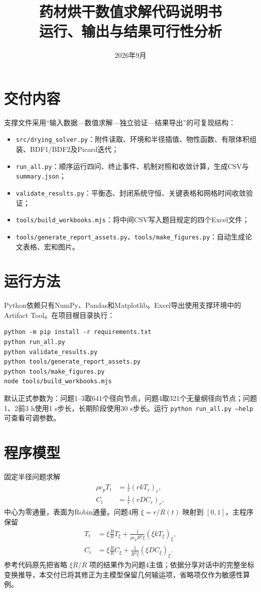 \documentclass[11pt,a4paper]{ctexart}
\title{\bfseries 药材烘干数值求解代码说明书\\[0.4em]\large 运行、输出与结果可行性分析}
\author{}
\date{2026年9月}
\begin{document}
\maketitle

\section{交付内容}
支撑文件采用“输入数据---数值求解---独立验证---结果导出”的可复现结构：
\begin{itemize}
  \item \texttt{src/drying\_solver.py}：附件读取、环境和半径插值、物性函数、有限体积组装、BDF1/BDF2及Picard迭代；
  \item \texttt{run\_all.py}：顺序运行四问、终止事件、机制对照和收敛计算，生成CSV与\texttt{summary.json}；
  \item \texttt{validate\_results.py}：平衡态、封闭系统守恒、关键表格和网格时间收敛验证；
  \item \texttt{tools/build\_workbooks.mjs}：将中间CSV写入题目规定的四个Excel文件；
  \item \texttt{tools/generate\_report\_assets.py}、\texttt{tools/make\_figures.py}：自动生成论文表格、宏和图片。
\end{itemize}

\section{运行方法}
Python依赖只有NumPy、Pandas和Matplotlib。Excel导出使用支撑环境中的Artifact Tool。在项目根目录执行：
\begin{verbatim}
python -m pip install -r requirements.txt
python run_all.py
python validate_results.py
python tools/generate_report_assets.py
python tools/make_figures.py
node tools/build_workbooks.mjs
\end{verbatim}
默认正式参数为：问题1--3取641个径向节点，问题4取321个无量纲径向节点；问题1、2前3 h使用1 s步长，长期阶段使用30 s步长。运行 \texttt{python run\_all.py --help} 可查看可调参数。

\section{程序模型}
固定半径问题求解
\begin{align}
\rho c_pT_t&=\frac1r(rkT_r)_r,\\
C_t&=\frac1r(rDC_r)_r,
\end{align}
中心为零通量，表面为Robin通量。问题4用 $\xi=r/R(t)$ 映射到 $[0,1]$，主程序保留
\begin{align}
T_t&=\xi\frac{\dot R}{R}T_\xi+\frac{1}{\rho c_pR^2\xi}(\xi kT_\xi)_\xi,\\
C_t&=\xi\frac{\dot R}{R}C_\xi+\frac{1}{R^2\xi}(\xi DC_\xi)_\xi.
\end{align}
参考代码原先把省略 $\xi\dot R/R$ 项的结果作为问题4主值；依据分享对话中的完整坐标变换推导，本交付已将其修正为主模型保留几何输运项，省略项仅作为敏感性算例。
\end{document}
